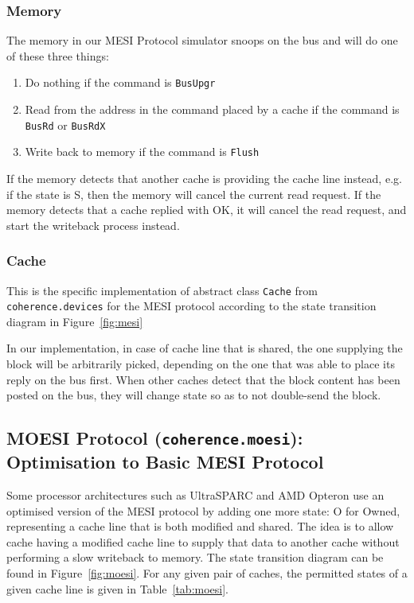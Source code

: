 \documentclass[nonacm,acmsmall,screen,11pt]{acmart}
\begin{document}
\subsubsection{Memory}
The memory in our MESI Protocol simulator snoops on the bus and will do one of these three things:
\begin{enumerate}
  \item Do nothing if the command is \texttt{BusUpgr}
  \item Read from the address in the command placed by a cache if the command is \texttt{BusRd} or \texttt{BusRdX}
  \item Write back to memory if the command is \texttt{Flush}
\end{enumerate}

If the memory detects that another cache is providing the cache line instead, e.g. if the state is S, then the memory will cancel the current read request.
If the memory detects that a cache replied with OK, it will cancel the read request, and start the writeback process instead.

\subsubsection{Cache}
This is the specific implementation of abstract class \texttt{Cache} from \texttt{coherence.devices} for the MESI protocol according to the state transition diagram in Figure~\ref{fig:mesi}

In our implementation, in case of cache line that is shared, the one supplying the block will be arbitrarily picked, depending on the one that was able to place its reply on the bus first.
When other caches detect that the block content has been posted on the bus, they will change state so as to not double-send the block.

\subsection{MOESI Protocol (\texttt{coherence.moesi}): Optimisation to Basic MESI Protocol}
Some processor architectures such as UltraSPARC \cite{microelectronics1997ultrasparc} and AMD Opteron \cite{Jacob:2007:MSC:1543376} use an optimised version of the MESI protocol by adding one more state: O for Owned, representing a cache line that is both modified and shared.
The idea is to allow cache having a modified cache line to supply that data to another cache without performing a slow writeback to memory.
The state transition diagram can be found in Figure~\ref{fig:moesi}. For any given pair of caches, the permitted states of a given cache line is given in Table~\ref{tab:moesi}.
\end{document}

